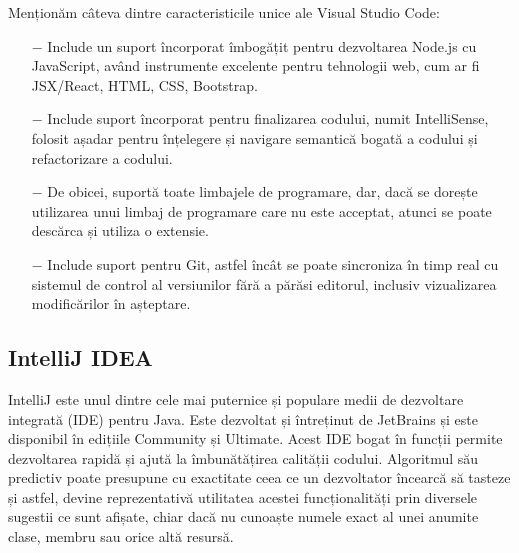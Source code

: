 Menționăm câteva dintre caracteristicile unice ale Visual Studio Code:
\begin{itemize}
	\addtolength{\itemindent}{1cm}
	\item[$-$]Include un suport încorporat îmbogățit pentru dezvoltarea Node.js cu JavaScript, având instrumente excelente pentru tehnologii web, cum ar fi JSX/React, HTML, CSS, Bootstrap.
	\item[$-$]Include suport încorporat pentru finalizarea codului, numit IntelliSense, folosit așadar pentru înțelegere și navigare semantică bogată a codului și refactorizare a codului.
	\item[$-$]De obicei, suportă toate limbajele de programare, dar, dacă se dorește utilizarea unui limbaj de programare care nu este acceptat, atunci se poate descărca și utiliza o extensie.
	\item[$-$]Include suport pentru Git, astfel încât se poate sincroniza în timp real cu sistemul de control al versiunilor fără a părăsi editorul, inclusiv vizualizarea modificărilor în așteptare.
	\newline
\end{itemize}



\subsection{IntelliJ IDEA}
IntelliJ este unul dintre cele mai puternice și populare medii de dezvoltare integrată (IDE) pentru Java. Este dezvoltat și întreținut de JetBrains și este disponibil în edițiile Community și Ultimate. Acest IDE bogat în funcții permite dezvoltarea rapidă și ajută la îmbunătățirea calității codului. Algoritmul său predictiv poate presupune cu exactitate ceea ce un dezvoltator încearcă să tasteze și astfel, devine reprezentativă utilitatea acestei funcționalități prin diversele sugestii ce sunt afișate, chiar dacă nu cunoaște numele exact al unei anumite clase, membru sau orice altă resursă.\newline

